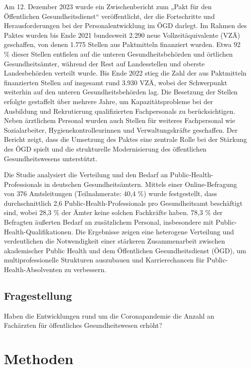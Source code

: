 \documentclass[
  ngerman,
  number,
  preprint,
  3p,
  twocolumn]{elsarticle}
\begin{document}
Am 12. Dezember 2023 wurde ein Zwischenbericht zum „Pakt für den
Öffentlichen Gesundheitsdienst`` veröffentlicht, der die Fortschritte
und Herausforderungen bei der Personalentwicklung im ÖGD darlegt. Im
Rahmen des Paktes wurden bis Ende 2021 bundesweit 2.290 neue
Vollzeitäquivalente (VZÄ) geschaffen, von denen 1.775 Stellen aus
Paktmitteln finanziert wurden. Etwa 92 \% dieser Stellen entfielen auf
die unteren Gesundheitsbehörden und örtlichen Gesundheitsämter, während
der Rest auf Landesstellen und oberste Landesbehörden verteilt wurde.
Bis Ende 2022 stieg die Zahl der aus Paktmitteln finanzierten Stellen
auf insgesamt rund 3.930 VZÄ, wobei der Schwerpunkt weiterhin auf den
unteren Gesundheitsbehörden lag. Die Besetzung der Stellen erfolgte
gestaffelt über mehrere Jahre, um Kapazitätsprobleme bei der Ausbildung
und Rekrutierung qualifizierten Fachpersonals zu berücksichtigen. Neben
ärztlichem Personal wurden auch Stellen für weiteres Fachpersonal wie
Sozialarbeiter, Hygienekontrolleurinnen und Verwaltungskräfte
geschaffen. Der Bericht zeigt, dass die Umsetzung des Paktes eine
zentrale Rolle bei der Stärkung des ÖGD spielt und die strukturelle
Modernisierung des öffentlichen Gesundheitswesens unterstützt.

Die Studie analysiert die Verteilung und den Bedarf an
Public-Health-Professionals in deutschen Gesundheitsämtern. Mittels
einer Online-Befragung von 376 Amtsleitungen (Teilnahmerate: 40,4 \%)
wurde festgestellt, dass durchschnittlich 2,6
Public-Health-Professionals pro Gesundheitsamt beschäftigt sind, wobei
28,3 \% der Ämter keine solchen Fachkräfte haben. 78,3 \% der Befragten
äußerten Bedarf an zusätzlichem Personal, insbesondere mit
Public-Health-Qualifikationen. Die Ergebnisse zeigen eine heterogene
Verteilung und verdeutlichen die Notwendigkeit einer stärkeren
Zusammenarbeit zwischen akademischer Public Health und dem Öffentlichen
Gesundheitsdienst (ÖGD), um multiprofessionelle Strukturen auszubauen
und Karrierechancen für Public-Health-Absolventen zu verbessern.

\subsection{Fragestellung}\label{fragestellung}

Haben die Entwicklungen rund um die Coronapandemie die Anzahl an
Fachärzten für öffentliches Gesundheitswesen erhöht?

\section{Methoden}\label{methoden}
\end{document}
